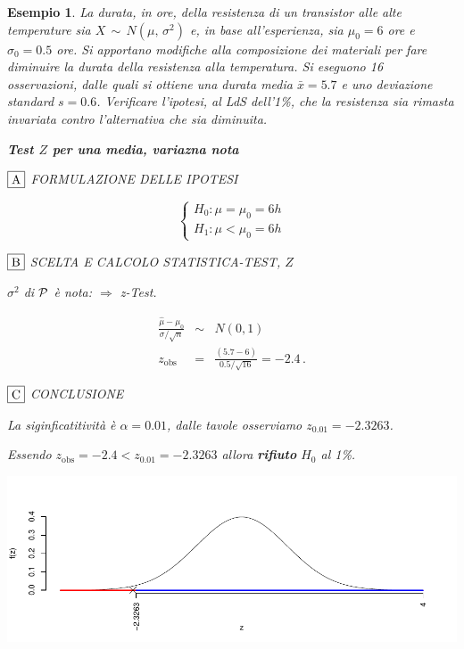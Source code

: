 \documentclass[
  11pt,
]{book}
\theoremstyle{mytheoremstyle}
\theoremstyle{mydefstyle}
\newtheorem{example}{{Esempio}}[section]
\begin{document}
\begin{example}

La durata, in ore, della resistenza di un transistor alle alte
temperature sia \(X \,\sim\, N(\mu,\, \sigma^{2})\) e, in base
all'esperienza, sia \(\mu_{0}=6\) ore e \(\sigma_{0}=0.5\) ore. Si apportano
modifiche alla composizione dei materiali per fare diminuire la durata
della resistenza alla temperatura. Si eseguono 16 osservazioni, dalle
quali si ottiene una durata media \(\bar{x}=5.7\) e uno deviazione
standard \(s=0.6\). Verificare l'ipotesi, al LdS dell'1\%, che la
resistenza sia rimasta invariata contro l'alternativa che sia diminuita.

\textbf{Test \(Z\) per una media, variazna nota}

\(\fbox{A}\) FORMULAZIONE DELLE IPOTESI

\[\begin{cases}
   H_0: \mu = \mu_0=6h \\
   H_1: \mu < \mu_0=6h 
   \end{cases}\]

\(\fbox{B}\) SCELTA E CALCOLO STATISTICA-TEST, \(Z\)

\(\sigma^{2}\) di \(\cal{P}\) è nota: \(\Rightarrow\) z-Test.

\begin{eqnarray*}
   \frac{\hat\mu - \mu_{0}} {\sigma/\sqrt{n}}&\sim&N(0,1)\\
   z_{\text{obs}}
   &=& \frac{ ( 5.7 -  6 )} { 0.5 /\sqrt{ 16 }}
   =   -2.4 \, .
   \end{eqnarray*}

\(\fbox{C}\) CONCLUSIONE

La siginficatitività è \(\alpha=0.01\), dalle tavole osserviamo \(z_{0.01}=-2.3263\).

Essendo \(z_\text{obs}=-2.4<z_{0.01}=-2.3263\) allora \textbf{rifiuto} \(H_0\) al 1\%.

\begin{center}\includegraphics{Appunti_di_Statistica_2025_files/figure-latex/15-test-mu-pi-3-1} \end{center}

\end{example}
\end{document}
